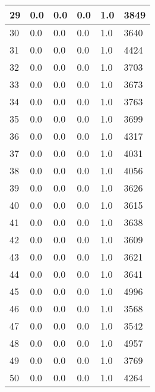 \begin{longtable}{|l|l|l|l|l|l|}
29 & 0.0 & 0.0 & 0.0 & 1.0 & 3849 \\ \hline 
30 & 0.0 & 0.0 & 0.0 & 1.0 & 3640 \\ \hline 
31 & 0.0 & 0.0 & 0.0 & 1.0 & 4424 \\ \hline 
32 & 0.0 & 0.0 & 0.0 & 1.0 & 3703 \\ \hline 
33 & 0.0 & 0.0 & 0.0 & 1.0 & 3673 \\ \hline 
34 & 0.0 & 0.0 & 0.0 & 1.0 & 3763 \\ \hline 
35 & 0.0 & 0.0 & 0.0 & 1.0 & 3699 \\ \hline 
36 & 0.0 & 0.0 & 0.0 & 1.0 & 4317 \\ \hline 
37 & 0.0 & 0.0 & 0.0 & 1.0 & 4031 \\ \hline 
38 & 0.0 & 0.0 & 0.0 & 1.0 & 4056 \\ \hline 
39 & 0.0 & 0.0 & 0.0 & 1.0 & 3626 \\ \hline 
40 & 0.0 & 0.0 & 0.0 & 1.0 & 3615 \\ \hline 
41 & 0.0 & 0.0 & 0.0 & 1.0 & 3638 \\ \hline 
42 & 0.0 & 0.0 & 0.0 & 1.0 & 3609 \\ \hline 
43 & 0.0 & 0.0 & 0.0 & 1.0 & 3621 \\ \hline 
44 & 0.0 & 0.0 & 0.0 & 1.0 & 3641 \\ \hline 
45 & 0.0 & 0.0 & 0.0 & 1.0 & 4996 \\ \hline 
46 & 0.0 & 0.0 & 0.0 & 1.0 & 3568 \\ \hline 
47 & 0.0 & 0.0 & 0.0 & 1.0 & 3542 \\ \hline 
48 & 0.0 & 0.0 & 0.0 & 1.0 & 4957 \\ \hline 
49 & 0.0 & 0.0 & 0.0 & 1.0 & 3769 \\ \hline 
50 & 0.0 & 0.0 & 0.0 & 1.0 & 4264 \\ \hline 
\end{longtable}